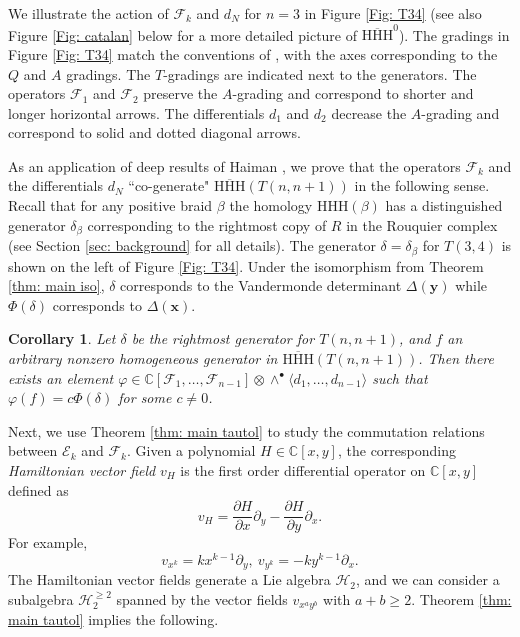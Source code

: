 \documentclass{amsart}
\newcommand{\C}{\mathbb{C}}
\newcommand{\xx}{\mathbf{x}}
\newcommand{\yy}{\mathbf{y}}
\newcommand{\CE}{\mathcal{E}}
\newcommand{\CF}{\mathcal{F}}
\newcommand{\HHH}{\mathrm{HHH}}
\numberwithin{equation}{section}
\newtheorem{corollary}[theorem]{Corollary}
\theoremstyle{definition}
\begin{document}
We illustrate the action of $\CF_k$ and $d_N$ for $n=3$ in Figure \ref{Fig: T34} (see also Figure \ref{Fig: catalan} below for a more detailed picture of $\overline{\HHH}^0$). The gradings in Figure \ref{Fig: T34} match the conventions of \cite{DGR}, with the axes corresponding to the $Q$ and $A$ gradings. The $T$-gradings are indicated next to the generators. The operators $\CF_1$ and $\CF_2$ preserve the $A$-grading and correspond to shorter and longer horizontal arrows. The differentials $d_1$ and $d_2$ decrease the $A$-grading and correspond to solid and dotted diagonal arrows.


As an application of deep results of Haiman \cite{HaimanInv}, we prove that the operators $\CF_k$ and the differentials $d_N$ ``co-generate" $\overline{\HHH}(T(n,n+1))$ in the following sense. Recall that for any positive braid $\beta$ the homology $\HHH(\beta)$ has a distinguished generator $\delta_{\beta}$ corresponding to the rightmost copy of $R$ in the Rouquier complex (see Section \ref{sec: background} for all details). The generator $\delta=\delta_{\beta}$ for $T(3,4)$ is shown on the left of Figure \ref{Fig: T34}. Under the isomorphism from Theorem \ref{thm: main iso}, $\delta$ corresponds to the Vandermonde determinant $\Delta(\yy)$ while $\Phi(\delta)$ corresponds to $\Delta(\xx)$.

\begin{corollary}
\label{cor: main cogenerate}
Let $\delta$ be the rightmost generator for $T(n,n+1)$, and $f$ an arbitrary nonzero homogeneous generator in $\overline{\HHH}(T(n,n+1))$. Then there exists an element $\varphi\in \C[\CF_1,\ldots,\CF_{n-1}]\otimes \wedge^{\bullet}\langle d_1,\ldots,d_{n-1}\rangle$ such that $\varphi(f)=c\Phi(\delta)$ for some $c\neq 0$. 
\end{corollary}



Next, we use Theorem \ref{thm: main tautol} to study the commutation relations between $\CE_k$ and $\CF_k$. Given a polynomial $H\in \C[x,y]$, the corresponding {\em Hamiltonian vector field} $v_H$ is the first order differential operator on $\C[x,y]$ defined as 
$$
v_H=\frac{\partial H}{\partial x}\partial_y-\frac{\partial H}{\partial y}\partial_x.
$$
For example,
$$
v_{x^k}=kx^{k-1}\partial_y,\ v_{y^k}=-ky^{k-1}\partial_x.
$$
The Hamiltonian vector fields generate a Lie algebra $\mathcal{H}_2$, and we can consider a subalgebra $\mathcal{H}_2^{\ge 2}$ spanned by the vector fields $v_{x^ay^b}$ with $a+b\ge 2$. Theorem \ref{thm: main tautol} implies the following. 
\end{document}
